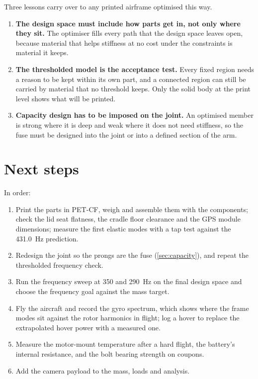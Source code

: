 Three lessons carry over to any printed airframe optimised this way.
\begin{enumerate}
\item \textbf{The design space must include how parts get in, not only where they sit.} The optimiser fills every path that the design space leaves open, because material that helps stiffness at no cost under the constraints is material it keeps.
\item \textbf{The thresholded model is the acceptance test.} Every fixed region needs a reason to be kept within its own part, and a connected region can still be carried by material that no threshold keeps. Only the solid body at the print level shows what will be printed.
\item \textbf{Capacity design has to be imposed on the joint.} An optimised member is strong where it is deep and weak where it does not need stiffness, so the fuse must be designed into the joint or into a defined section of the arm.
\end{enumerate}

\section{Next steps}\label{sec:res-next}

In order:
\begin{enumerate}
\item Print the parts in PET-CF, weigh and assemble them with the components; check the lid seat flatness, the cradle floor clearance and the GPS module dimensions; measure the first elastic modes with a tap test against the \SI{431.0}{Hz} prediction.
\item Redesign the joint so the prongs are the fuse (\cref{sec:capacity}), and repeat the thresholded frequency check.
\item Run the frequency sweep at 350 and \SI{290}{Hz} on the final design space and choose the frequency goal against the mass target.
\item Fly the aircraft and record the gyro spectrum, which shows where the frame modes sit against the rotor harmonics in flight; log a hover to replace the extrapolated hover power with a measured one.
\item Measure the motor-mount temperature after a hard flight, the battery's internal resistance, and the bolt bearing strength on coupons.
\item Add the camera payload to the mass, loads and analysis.
\end{enumerate}
